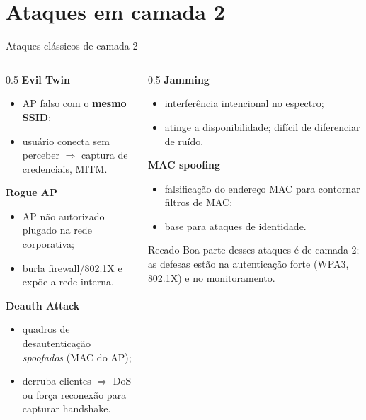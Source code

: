 \documentclass[aspectratio=169,11pt]{beamer}
\begin{document}
\section{Ataques em camada 2}

\begin{frame}{Ataques clássicos de camada 2}
  \begin{columns}
    \begin{column}{0.5\textwidth}
      \textbf{Evil Twin}
      \begin{itemize}
        \item AP falso com o \textbf{mesmo SSID};
        \item usuário conecta sem perceber $\Rightarrow$ captura de credenciais, MITM.
      \end{itemize}
      \textbf{Rogue AP}
      \begin{itemize}
        \item AP não autorizado plugado na rede corporativa;
        \item burla firewall/802.1X e expõe a rede interna.
      \end{itemize}
      \textbf{Deauth Attack}
      \begin{itemize}
        \item quadros de desautenticação \emph{spoofados} (MAC do AP);
        \item derruba clientes $\Rightarrow$ DoS ou força reconexão para capturar handshake.
      \end{itemize}
    \end{column}
    \begin{column}{0.5\textwidth}
      \textbf{Jamming}
      \begin{itemize}
        \item interferência intencional no espectro;
        \item atinge a disponibilidade; difícil de diferenciar de ruído.
      \end{itemize}
      \textbf{MAC spoofing}
      \begin{itemize}
        \item falsificação do endereço MAC para contornar filtros de MAC;
        \item base para ataques de identidade.
      \end{itemize}
      \begin{alertblock}{Recado}
        Boa parte desses ataques é de camada 2; as defesas estão na autenticação forte (WPA3, 802.1X) e no monitoramento.
      \end{alertblock}
    \end{column}
  \end{columns}
\end{frame}
\end{document}
